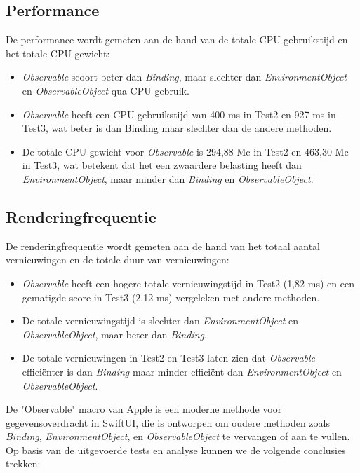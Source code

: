 \subsection{Performance}
De performance wordt gemeten aan de hand van de totale CPU-gebruikstijd en het totale CPU-gewicht:
\begin{itemize}
    \item \textit{Observable} scoort beter dan \textit{Binding}, maar slechter dan \textit{EnvironmentObject} en \textit{ObservableObject} qua CPU-gebruik. 
    \item \textit{Observable} heeft een CPU-gebruikstijd van 400 ms in Test2 en 927 ms in Test3, wat beter is dan Binding maar slechter dan de andere methoden.
    \item De totale CPU-gewicht voor \textit{Observable} is 294,88 Mc in Test2 en 463,30 Mc in Test3, wat betekent dat het een zwaardere belasting heeft dan \textit{EnvironmentObject}, maar minder dan \textit{Binding} en \textit{ObservableObject}.
\end{itemize}

\subsection{Renderingfrequentie}
De renderingfrequentie wordt gemeten aan de hand van het totaal aantal vernieuwingen en de totale duur van vernieuwingen:
\begin{itemize}
    \item \textit{Observable} heeft een hogere totale vernieuwingstijd in Test2 (1,82 ms) en een gematigde score in Test3 (2,12 ms) vergeleken met andere methoden.
    \item De totale vernieuwingstijd is slechter dan \textit{EnvironmentObject} en \textit{ObservableObject}, maar beter dan \textit{Binding}.
    \item De totale vernieuwingen in Test2 en Test3 laten zien dat \textit{Observable} efficiënter is dan \textit{Binding} maar minder efficiënt dan \textit{EnvironmentObject} en \textit{ObservableObject}.
\end{itemize}


De "Observable" macro van Apple is een moderne methode voor gegevensoverdracht in SwiftUI, die is ontworpen om oudere methoden zoals \textit{Binding}, \textit{EnvironmentObject}, en \textit{ObservableObject} te vervangen of aan te vullen. Op basis van de uitgevoerde tests en analyse kunnen we de volgende conclusies trekken:

